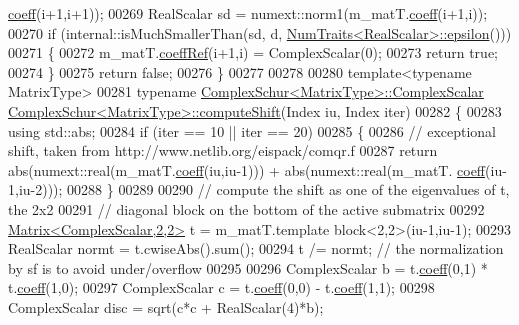 \begin{DoxyCode}
      \hyperlink{class_eigen_1_1_plain_object_base_afbfc12954f16d21aedb7bd839f64a278}{coeff}(i+1,i+1));
00269   RealScalar sd = numext::norm1(m\_matT.\hyperlink{class_eigen_1_1_plain_object_base_afbfc12954f16d21aedb7bd839f64a278}{coeff}(i+1,i));
00270   \textcolor{keywordflow}{if} (internal::isMuchSmallerThan(sd, d, \hyperlink{group___core___module_struct_eigen_1_1_num_traits}{NumTraits<RealScalar>::epsilon}()))
00271   \{
00272     m\_matT.\hyperlink{class_eigen_1_1_plain_object_base_a25626a55b26a4323565f79d1b7c48ea8}{coeffRef}(i+1,i) = ComplexScalar(0);
00273     \textcolor{keywordflow}{return} \textcolor{keyword}{true};
00274   \}
00275   \textcolor{keywordflow}{return} \textcolor{keyword}{false};
00276 \}
00277 
00278 
00280 \textcolor{keyword}{template}<\textcolor{keyword}{typename} MatrixType>
00281 \textcolor{keyword}{typename} \hyperlink{group___eigenvalues___module_class_eigen_1_1_complex_schur}{ComplexSchur<MatrixType>::ComplexScalar} 
      \hyperlink{group___eigenvalues___module_class_eigen_1_1_complex_schur}{ComplexSchur<MatrixType>::computeShift}(Index iu, Index iter)
00282 \{
00283   \textcolor{keyword}{using} std::abs;
00284   \textcolor{keywordflow}{if} (iter == 10 || iter == 20) 
00285   \{
00286     \textcolor{comment}{// exceptional shift, taken from http://www.netlib.org/eispack/comqr.f}
00287     \textcolor{keywordflow}{return} abs(numext::real(m\_matT.\hyperlink{class_eigen_1_1_plain_object_base_afbfc12954f16d21aedb7bd839f64a278}{coeff}(iu,iu-1))) + abs(numext::real(m\_matT.
      \hyperlink{class_eigen_1_1_plain_object_base_afbfc12954f16d21aedb7bd839f64a278}{coeff}(iu-1,iu-2)));
00288   \}
00289 
00290   \textcolor{comment}{// compute the shift as one of the eigenvalues of t, the 2x2}
00291   \textcolor{comment}{// diagonal block on the bottom of the active submatrix}
00292   \hyperlink{group___core___module_class_eigen_1_1_matrix}{Matrix<ComplexScalar,2,2>} t = m\_matT.template block<2,2>(iu-1,iu-1);
00293   RealScalar normt = t.cwiseAbs().sum();
00294   t /= normt;     \textcolor{comment}{// the normalization by sf is to avoid under/overflow}
00295 
00296   ComplexScalar b = t.\hyperlink{class_eigen_1_1_plain_object_base_afbfc12954f16d21aedb7bd839f64a278}{coeff}(0,1) * t.\hyperlink{class_eigen_1_1_plain_object_base_afbfc12954f16d21aedb7bd839f64a278}{coeff}(1,0);
00297   ComplexScalar c = t.\hyperlink{class_eigen_1_1_plain_object_base_afbfc12954f16d21aedb7bd839f64a278}{coeff}(0,0) - t.\hyperlink{class_eigen_1_1_plain_object_base_afbfc12954f16d21aedb7bd839f64a278}{coeff}(1,1);
00298   ComplexScalar disc = sqrt(c*c + RealScalar(4)*b);

\end{DoxyCode}
